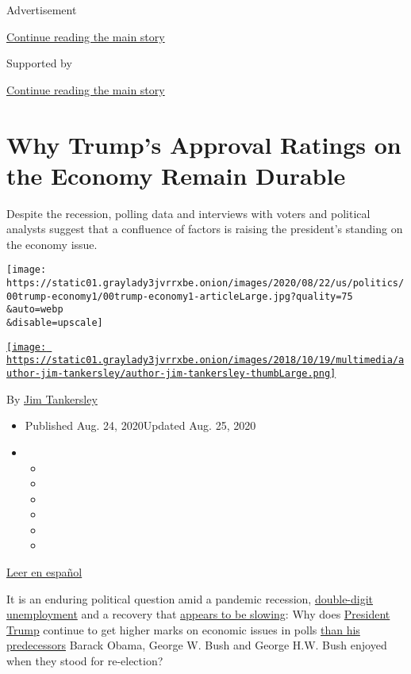 Advertisement

\protect\hyperlink{after-top}{Continue reading the main story}

Supported by

\protect\hyperlink{after-sponsor}{Continue reading the main story}

\hypertarget{why-trumps-approval-ratings-on-the-economy-remain-durable}{%
\section{Why Trump's Approval Ratings on the Economy Remain
Durable}\label{why-trumps-approval-ratings-on-the-economy-remain-durable}}

Despite the recession, polling data and interviews with voters and
political analysts suggest that a confluence of factors is raising the
president's standing on the economy issue.

\texttt{[image: https://static01.graylady3jvrrxbe.onion/images/2020/08/22/us/politics/00trump-economy1/00trump-economy1-articleLarge.jpg?quality=75\\\&auto=webp\\\&disable=upscale]}

\href{https://www.nytimes3xbfgragh.onion/by/jim-tankersley}{\texttt{[image: https://static01.graylady3jvrrxbe.onion/images/2018/10/19/multimedia/author-jim-tankersley/author-jim-tankersley-thumbLarge.png]}}

By \href{https://www.nytimes3xbfgragh.onion/by/jim-tankersley}{Jim
Tankersley}

\begin{itemize}
\item
  Published Aug. 24, 2020Updated Aug. 25, 2020
\item
  \begin{itemize}
  \item
  \item
  \item
  \item
  \item
  \item
  \end{itemize}
\end{itemize}

\href{https://www.nytimes3xbfgragh.onion/es/2020/08/25/espanol/estados-unidos/trump-economia.html}{Leer
en español}

It is an enduring political question amid a pandemic recession,
\href{https://www.nytimes3xbfgragh.onion/2020/08/20/business/economy/unemployment-claims.html}{double-digit
unemployment} and a recovery that
\href{https://www.nytimes3xbfgragh.onion/2020/08/21/business/economy/coronavirus-economic-recovery.html?action=click\&module=Top\%20Stories\&pgtype=Homepage}{appears
to be slowing}: Why does
\href{https://www.nytimes3xbfgragh.onion/2020/08/26/us/politics/trump-convention-night-2.html}{President
Trump} continue to get higher marks on economic issues in polls
\href{https://news.gallup.com/poll/313070/trump-economic-ratings-no-longer-best-class.aspx}{than
his predecessors} Barack Obama, George W. Bush and George H.W. Bush
enjoyed when they stood for re-election?

